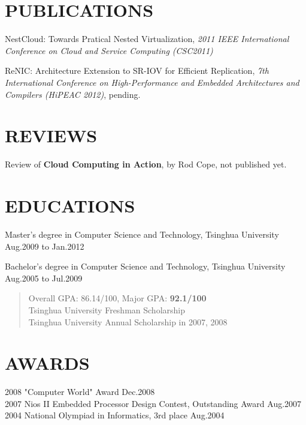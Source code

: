 \documentclass[11pt]{res} %
\begin{document}
\begin{resume}


\section{PUBLICATIONS}
NestCloud: Towards Pratical Nested Virtualization, \emph{2011 IEEE
  International Conference on Cloud and Service Computing (CSC2011)}

ReNIC: Architecture Extension to SR-IOV for Efficient Replication,
\emph{7th International Conference on High-Performance and Embedded
  Architectures and Compilers (HiPEAC 2012)}, pending.

\section{REVIEWS}
Review of \textbf{Cloud Computing in Action}, by Rod Cope, not published yet.

\section{EDUCATIONS}
Master's degree in Computer Science and Technology, Tsinghua University \\
\hspace*{\fill} Aug.2009 to Jan.2012

Bachelor's degree in Computer Science and Technology, Tsinghua University \\
\hspace*{\fill} Aug.2005 to Jul.2009
\begin{quote}
Overall GPA: 86.14/100, Major GPA: \textbf{92.1/100} \\
Tsinghua University Freshman Scholarship \\
Tsinghua University Annual Scholarship in 2007, 2008 \\
\end{quote}

\section{AWARDS}
2008 "Computer World" Award \hfill Dec.2008 \\
2007 Nios II Embedded Processor Design Contest, Outstanding Award \hfill Aug.2007 \\
2004 National Olympiad in Informatics, 3rd place \hfill Aug.2004

\end{resume}
\end{document}
